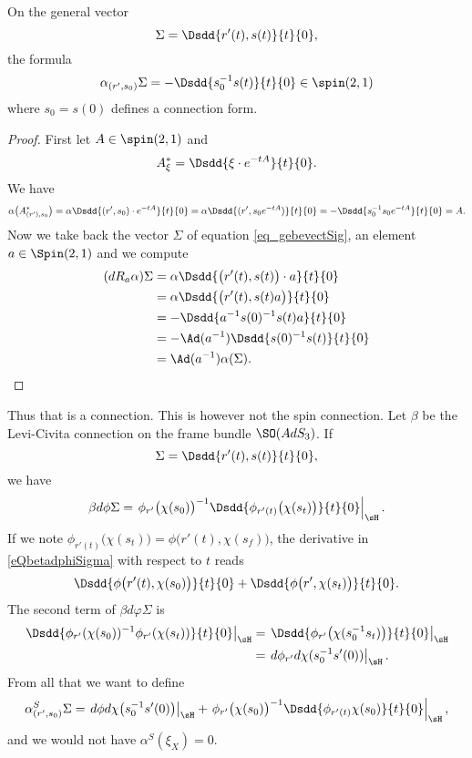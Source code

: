 \begin{lemma}
On the general vector
\begin{equation}   \label{eq_gebevectSig}
  \Sigma=\Dsdd{ r'(t),s(t) }{t}{0},
\end{equation}
the formula
\begin{equation}
\alpha_{(r',s_{0})}\Sigma=-\Dsdd{ s_{0}^{-1}s(t) }{t}{0}\in\spin(2,1)
\end{equation}
where $s_{0}=s(0)$ defines a connection form.

\end{lemma}

\begin{proof}
First let $A\in\spin(2,1)$ and
\[
  A^*_{\xi}=\Dsdd{ \xi\cdot e^{-tA} }{t}{0}.
\]
We have
\[
   \alpha\big( A^*_{(r'),s_{0}} \big)=\alpha \Dsdd{ (r',s_{0})\cdot e^{-tA}  }{t}{0}
        =\alpha\Dsdd{ (r',s_{0} e^{-tA}) }{t}{0}
        =-\Dsdd{ s_{0}^{-1}s_{0} e^{-tA}} {t}{0}
        =A.
\]
Now we take back the vector $\Sigma$ of equation \eqref{eq_gebevectSig}, an element $a\in\Spin(2,1)$ and we compute
\[
\begin{split}
  (dR_{a}\alpha)\Sigma&=\alpha\Dsdd{ \big( r'(t),s(t) \big)\cdot a }{t}{0}\\
        &=\alpha\Dsdd{ \big( r'(t),s(t)a \big) }{t}{0}\\
        &=-\Dsdd{ a^{-1}s(0)^{-1}s(t)a }{t}{0}\\
        &=-\Ad(a^{-1})\Dsdd{ s(0)^{-1}s(t) }{t}{0}\\
        &=\Ad(a^{-1})\alpha(\Sigma).
\end{split}
\]

\end{proof}
Thus that is a connection. This is however not the spin connection. Let $\beta$ be the Levi-Civita connection on the frame bundle $\SO(AdS_3)$. If
\[
  \Sigma=\Dsdd{ r'(t),s(t) }{t}{0},
\]
we have
\begin{equation} \label{eQbetadphiSigma}
  \beta d\phi\Sigma=\left. \phi_{r'}\big( \chi(s_{0}) \big)^{-1}\Dsdd{ \phi_{r'(t)}\big( \chi(s_{t}) \big) }{t}{0}\right|_{\sH}.
\end{equation}
If we note $\phi_{r'(t)}\big( \chi(s_{t}) \big)=\phi\big( r'(t),\chi(s_{f}) \big)$, the derivative in \eqref{eQbetadphiSigma} with respect to $t$ reads
\begin{equation}
\Dsdd{ \phi\big( r'(t),\chi(s_{0}) \big) }{t}{0}+\Dsdd{ \phi\big( r',\chi(s_{t}) \big) }{t}{0}.
\end{equation}
The second term of $\beta d\varphi\Sigma$ is
\begin{align*}
\left. \Dsdd{ \phi_{r'}(\chi(s_{0}))^{-1}\phi_{r'}(\chi(s_{t})) }{t}{0}\right|_{\sH}
        &=\left. \Dsdd{ \phi_{r'}\big( \chi(s_{0}^{-1}s_{t}) \big) }{t}{0}\right|_{\sH}\\
        &=\left. d\phi_{r'}d\chi(s_{0}^{-1}s'(0))\right|_{\sH}.
\end{align*}
From all that we want to define
\begin{equation}
   \alpha^{S}_{(r',s_{0})}\Sigma=\left.d\phi d\chi\big(s_{0}^{-1}s'(0)\big)\right|_{\sH}+\left.\phi_{r'}\big( \chi(s_{0}) \big)^{-1}\Dsdd{ \phi_{r'(t)}\chi(s_{0}) }{t}{0}\right|_{\sH},
\end{equation}
and we would not have $\alpha^{S}(\xi_{X})=0$.


